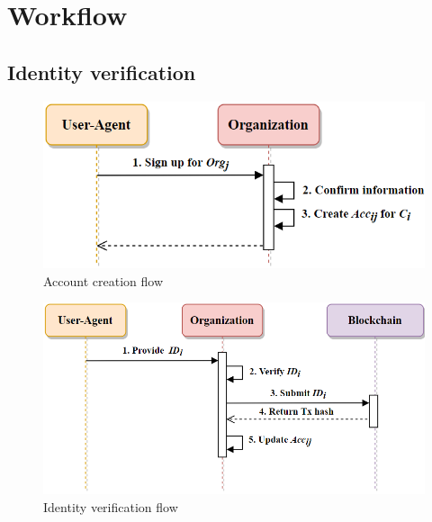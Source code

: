 \section{Workflow} \label{ssec:workflow}
    \subsection{Identity verification}
    \begin{figure}[htb]
        \centering
        \includegraphics[height=!,width=0.8\linewidth,keepaspectratio=true]{figures/account_creation.png}
        \caption{{\footnotesize Account creation flow}}
        \label{fig:accountCreation}
    \end{figure}
    
    \begin{figure}[htb]
        \centering
        \includegraphics[height=!,width=0.8\linewidth,keepaspectratio=true]{figures/identity_verification.png}
        \caption{{\footnotesize Identity verification flow}}
        \label{fig:identityVerification}
    \end{figure}
    


    \newpage
